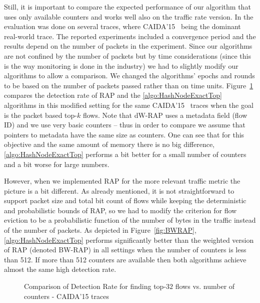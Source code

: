 Still, it is important to compare the expected performance of our algorithm that uses only available counters and works well also on the traffic rate version. In \cite{Ben-Basat2017} the evaluation was done on several traces, where CAIDA’15~\cite{CAIDA15} being the dominant real-world trace. The reported experiments included a convergence period and the results depend on the number of packets in the experiment. Since our algorithms are not confined by the number of packets but by time considerations (since this is the way monitoring is done in the industry) we had to slightly modify our algorithms to allow a comparison. We changed the algorithms’ epochs and rounds to be based on the number of packets passed rather than on time units. Figure~\ref{fig:RAP} compares the detection rate of RAP and the \ref{algo:HashNodeExactTop} algorithms in this modified setting for the same CAIDA’15~\cite{CAIDA15} traces when the goal is the packet based top-$k$ flows. Note that dW-RAP uses a metadata field (flow ID) and we use very basic counters – thus in order to compare we assume that pointers to metadata have the same size as counters. One can see that for this objective and the same amount of memory there is no big difference, \ref{algo:HashNodeExactTop} performs a bit better for a small number of counters and a bit worse for large numbers. 

However, when we implemented RAP for the more relevant traffic metric the picture is a bit different.  As already mentioned, it is not straightforward to support packet size and total bit count of flows while keeping the deterministic and probabilistic bounds of RAP, so we had to modify the criterion for flow eviction to be a probabilistic function of the number of bytes in the traffic instead of the number of packets. As depicted in Figure~\ref{fig:BWRAP}, \ref{algo:HashNodeExactTop} performs significantly better than the weighted version of RAP (denoted BW-RAP) in all settings when the number of counters is less than 512. If more than 512 counters are available then both algorithms achieve almost the same high detection rate. 

\begin{figure}
    \centering
    \caption{Comparison of Detection Rate for finding top-$32$ flows vs. number of counters - CAIDA'15 traces}
    \label{fig:RAP}

\end{figure}

